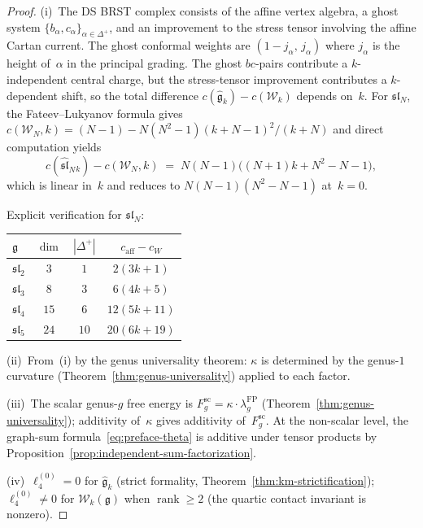 \begin{proof}
(i)~The DS BRST complex consists of the affine vertex algebra, a
ghost system $\{b_\alpha,c_\alpha\}_{\alpha\in\Delta^+}$,
and an improvement to the stress tensor involving the affine
Cartan current. The ghost conformal weights are
$(1{-}j_\alpha,\,j_\alpha)$ where $j_\alpha$ is the height
of~$\alpha$ in the principal grading.
The ghost $bc$-pairs contribute a $k$-independent central
charge, but the stress-tensor improvement contributes
a $k$-dependent shift, so the total difference
$c(\hat{\mathfrak{g}}_k) - c(\mathcal{W}_k)$ depends on~$k$.
For $\mathfrak{sl}_N$, the Fateev--Lukyanov formula gives
$c(\mathcal{W}_N, k) = (N{-}1) - N(N^2{-}1)(k{+}N{-}1)^2/(k{+}N)$
and direct computation yields
\[
c(\hat{\mathfrak{sl}}_N{}_k) - c(\mathcal{W}_N, k)
\;=\;
N(N{-}1)\bigl((N{+}1)k + N^2{-}N{-}1\bigr),
\]
which is linear in~$k$ and reduces to $N(N{-}1)(N^2{-}N{-}1)$
at~$k = 0$.

Explicit verification for $\mathfrak{sl}_N$:
\begin{center}
\renewcommand{\arraystretch}{1.15}
\begin{tabular}{lccc}
$\mathfrak g$ & $\dim$ & $|\Delta^+|$
 & $c_{\mathrm{aff}}-c_{W}$ \\
\hline
$\mathfrak{sl}_2$ & $3$ & $1$ & $2(3k{+}1)$ \\
$\mathfrak{sl}_3$ & $8$ & $3$ & $6(4k{+}5)$ \\
$\mathfrak{sl}_4$ & $15$ & $6$ & $12(5k{+}11)$ \\
$\mathfrak{sl}_5$ & $24$ & $10$ & $20(6k{+}19)$
\end{tabular}
\end{center}

\noindent
(ii)~From~(i) by the genus universality theorem:
$\kappa$ is determined by the genus-$1$ curvature
(Theorem~\ref{thm:genus-universality}) applied to each factor.

\noindent
(iii)~The scalar genus-$g$ free energy is
$F_g^{\mathrm{sc}}=\kappa\cdot\lambda_g^{\mathrm{FP}}$
\textup{(}Theorem~\ref{thm:genus-universality}\textup{)};
additivity of~$\kappa$ gives additivity of~$F_g^{\mathrm{sc}}$.
At the non-scalar level, the graph-sum formula~\eqref{eq:preface-theta}
is additive under
tensor products by
Proposition~\ref{prop:independent-sum-factorization}.

\noindent
(iv)~$\ell_4^{(0)}=0$ for $\widehat{\mathfrak g}_k$ (strict
formality, Theorem~\ref{thm:km-strictification}); $\ell_4^{(0)}\neq 0$
for $\mathcal W_k(\mathfrak g)$ when $\operatorname{rank}\ge 2$
(the quartic contact invariant is nonzero).
\end{proof}

